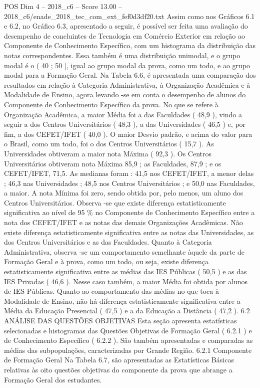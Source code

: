 \begin{textsample}{POS Dim 4 – 2018\_c6 – Score 13.00 – 2018\_c6/enade\_2018\_tec\_com\_ext\_fef0d3df20.txt}
Assim como nos Gráficos 6.1 e 6.2, no Gráfico 6.3, apresentado a seguir, é possível ser feita uma avaliação do desempenho de concluintes de Tecnologia em Comércio Exterior em relação ao Componente de Conhecimento Específico, com um histograma da distribuição das notas correspondentes.
Essa também é uma distribuição unimodal, e o grupo modal é o ( 40 ; 50 ], igual ao grupo modal da prova, como um todo, e ao grupo modal para a Formação Geral.
Na Tabela 6.6, é apresentada uma comparação dos resultados em relação à Categoria Administrativa, à Organização Acadêmica e à Modalidade de Ensino, agora levando -se em conta o desempenho de alunos do Componente de Conhecimento Específico da prova.
No que se refere à Organização Acadêmica, a maior Média foi a das Faculdades ( 48,9 ), vindo a seguir a dos Centros Universitários ( 48,3 ), a das Universidades ( 46,5 ) e, por fim, a dos CEFET/IFET ( 40,0 ).
O maior Desvio padrão, e acima do valor para o Brasil, como um todo, foi o dos Centros Universitários ( 15,7 ).
As Universidades obtiveram a maior nota Máxima ( 92,3 ).
Os Centros Universitários obtiveram nota Máxima 85,9 ; as Faculdades, 87,9 ; e os CEFET/IFET, 71,5.
As medianas foram : 41,5 nos CEFET/IFET, a menor delas ; 46,3 nas Universidades ; 48,5 nos Centros Universitários ; e 50,0 nas Faculdades, a maior.
A nota Mínima foi zero, sendo obtida por, pelo menos, um aluno dos Centros Universitários.
Observa -se que existe diferença estatisticamente significativa ao nível de 95 \% no Componente de Conhecimento Específico entre a nota dos CEFET/IFET e as notas das demais Organizações Acadêmicas.
Não existe diferença estatisticamente significativa entre as notas das Universidades, as dos Centros Universitários e as das Faculdades.
Quanto à Categoria Administrativa, observa -se um comportamento semelhante àquele da parte de Formação Geral e à prova, como um todo, ou seja, existe diferença estatisticamente significativa entre as médias das IES Públicas ( 50,5 ) e as das IES Privadas ( 46,6 ).
Nesse caso também, a maior Média foi obtida por alunos de IES Públicas.
Quanto ao comportamento das médias no que toca à Modalidade de Ensino, não há diferença estatisticamente significativa entre a Média da Educação Presencial ( 47,5 ) e a da Educação a Distância ( 47,2 ). 6.2 ANÁLISE DAS QUESTÕES OBJETIVAS Esta seção apresenta estatísticas selecionadas e histogramas das Questões Objetivas de Formação Geral ( 6.2.1 ) e de Conhecimento Específico ( 6.2.2 ).
São também apresentadas e comparadas as médias das subpopulações, caracterizadas por Grande Região. 6.2.1 Componente de Formação Geral Na Tabela 6.7, são apresentadas as Estatísticas Básicas relativas às oito questões objetivas do componente da prova que abrange a Formação Geral dos estudantes.

\end{textsample}

